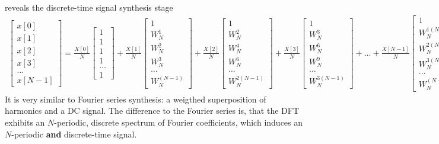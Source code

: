 \documentclass[11pt,a4paper,DIV=12]{scrartcl}
\begin{document}
reveals the discrete-time signal synthesis stage
\label{LinComb_for_IDFT}
%
\begin{align*}
\begin{bmatrix}
x[0]\\[1em]
x[1]\\[1em]
x[2]\\[1em]
x[3]\\[1em]
\dots\\[1em]
x[N-1]
\end{bmatrix}
=
\frac{X[0]}{N}
\begin{bmatrix}
1\\[1em]
1\\[1em]
1\\[1em]
1\\[1em]
\dots\\[1em]
1
\end{bmatrix}
+\frac{X[1]}{N}
\begin{bmatrix}
1\\[1em]
W_N^1\\[1em]
W_N^2\\[1em]
W_N^3\\[1em]
\dots\\[1em]
W_N^{(N-1)}
\end{bmatrix}
+\frac{X[2]}{N}
\begin{bmatrix}
1\\[1em]
W_N^2\\[1em]
W_N^4\\[1em]
W_N^6\\[1em]
\dots\\[1em]
W_N^{2(N-1)}
\end{bmatrix}
+\frac{X[3]}{N}
\begin{bmatrix}
1\\[1em]
W_N^3\\[1em]
W_N^6\\[1em]
W_N^9\\[1em]
\dots\\[1em]
W_N^{3(N-1)}
\end{bmatrix}
+
\dots
+\frac{X[N-1]}{N}
\begin{bmatrix}
1\\[1em]
W_N^{1(N-1)}\\[1em]
W_N^{2(N-1)}\\[1em]
W_N^{3(N-1)}\\[1em]
\dots\\[1em]
W_N^{(N-1)(N-1)}
\end{bmatrix}.
\end{align*}
%
It is very similar to Fourier series synthesis: a weigthed superposition of
harmonics and a DC signal.
%
The difference to the Fourier series is, that the DFT exhibits an
$N$-periodic, discrete spectrum of Fourier coefficients,
which induces an $N$-periodic \textbf{and} discrete-time signal.
%
\end{document}
